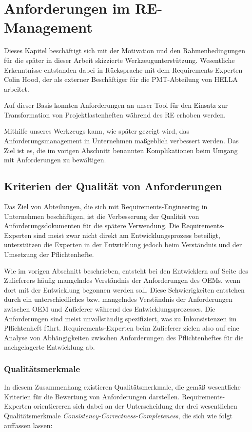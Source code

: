 \documentclass[12pt]{report}
\begin{document}
\section{Anforderungen im RE-Management}
Dieses Kapitel beschäftigt sich mit der Motivation und den Rahmenbedingungen für die später in dieser Arbeit skizzierte Werkzeugunterstützung. Wesentliche Erkenntnisse entstanden dabei in Rücksprache mit dem Requirements-Experten Colin Hood, der als externer Beschäftiger für die PMT-Abteilung von HELLA arbeitet. 

Auf dieser Basis konnten Anforderungen an unser Tool für den Einsatz zur Transformation von Projektlastenheften während des RE erhoben werden. 

Mithilfe unseres Werkzeugs kann, wie später gezeigt wird, das Anforderungsmanagement in Unternehmen maßgeblich verbessert werden. Das Ziel ist es, die im vorigen Abschnitt benannten Komplikationen beim Umgang mit Anforderungen zu bewältigen.

\subsection{Kriterien der Qualität von Anforderungen}
Das Ziel von Abteilungen, die sich mit Requirements-Engineering in Unternehmen beschäftigen, ist die Verbesserung der Qualität von Anforderungsdokumenten für die spätere Verwendung. Die Requirements-Experten sind meist zwar nicht direkt am Entwicklungsprozess beteiligt, unterstützen die Experten in der Entwicklung jedoch beim Verständnis und der Umsetzung der Pflichtenhefte.

Wie im vorigen Abschnitt beschrieben, entsteht bei den Entwicklern auf Seite des Zulieferers häufig mangelndes Verständnis der Anforderungen des OEMs, wenn dort mit der Entwicklung begonnen werden soll. Diese Schwierigkeiten entstehen durch ein unterschiedliches bzw. mangelndes Verständnis der Anforderungen zwischen OEM und Zulieferer während des Entwicklungsprozesses. Die Anforderungen sind meist unvollständig spezifiziert, was zu Inkonsistenzen im Pflichtenheft führt. Requirements-Experten beim Zulieferer zielen also auf eine Analyse von Abhängigkeiten zwischen Anforderungen des Pflichtenheftes für die nachgelagerte Entwicklung ab. 

\subsubsection{Qualitätsmerkmale}
In diesem Zusammenhang existieren Qualitätsmerkmale, die gemäß \cite{zg02} wesentliche Kriterien für die Bewertung von Anforderungen darstellen. Requirements-Experten orientiereren sich dabei an der Unterscheidung der drei wesentlichen Qualitätsmerkmale \textit{Consistency-Correctness-Completeness}, die sich wie folgt auffassen lassen:
\end{document}
